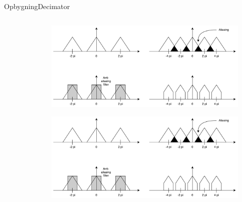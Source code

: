 \begin{frame}{Opbygning}{Decimator}
\begin{columns}
\begin{column}{0.3\textwidth}
\begin{figure}
			\end{figure}									
		\end{column}
		\begin{column}{0.3\textwidth}
			\begin{figure}
				\centering
				\includegraphics[width=\textwidth]{aliasing2}
			\end{figure}
			\begin{figure}
				\centering
				\includegraphics[width=\textwidth]{aliasing4}
			\end{figure}
		\end{column}
	\end{columns}
\end{frame}

